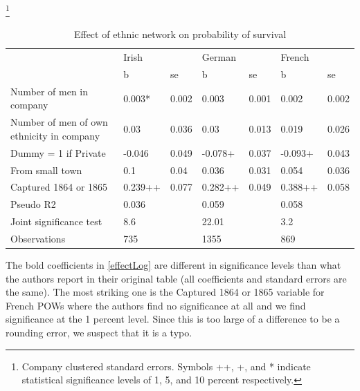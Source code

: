 \documentclass{article}
\begin{document}
\begin{table}
\caption{Effect of ethnic network on probability of survival}\footnote{Company clustered standard errors. Symbols ++, +, and * indicate statistical significance levels of 1, 5, and 10 percent respectively.}
\label{ethnic}
\begin{tabular}{lllllll}
\hline

                                          & \multicolumn{2}{l}{Irish} & \multicolumn{2}{l}{German} & \multicolumn{2}{l}{French} \\
                                          & b                         & se                         & b                          & se & b & se \\
Number of men in company                  & 0.003*                    & 0.002                      & 0.003                      & 0.001 & 0.002 & 0.002 \\
Number of men of own ethnicity in company & 0.03                      & 0.036                      & 0.03                       & 0.013 & 0.019 & 0.026 \\
Dummy = 1 if Private                      & -0.046                    & 0.049                      & -0.078+                    & 0.037 & -0.093+ & 0.043 \\
From small town                           & 0.1                       & 0.04                       & 0.036                      & 0.031 & 0.054 & 0.036 \\
Captured 1864 or 1865                     & 0.239++                   & 0.077                      & 0.282++                    & 0.049 & 0.388++ & 0.058 \\
Pseudo R2                                 & 0.036                     &                            & 0.059                      &  & 0.058 &  \\
Joint significance test                   & 8.6                       &                            & 22.01                      &  & 3.2 &  \\
Observations                              & 735                       &                            & 1355                       &  & 869 &  \\
\end{tabular}
\end{table}

The bold coefficients in \autoref{effectLog} are different in significance levels than what the authors report in their original table (all coefficients and standard errors are the same). The most striking one is the Captured 1864 or 1865 variable for French POWs where the authors find no significance at all and we find significance at the 1 percent level. Since this is too large of a difference to be a rounding error, we suspect that it is a typo.
\end{document}
